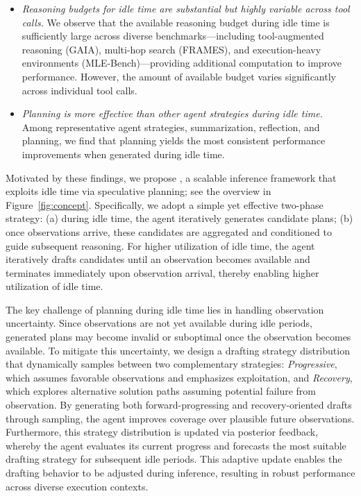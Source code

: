 \begin{itemize}
\item \textit{Reasoning budgets for idle time are substantial but highly variable across tool calls.} 
We observe that the available reasoning budget during idle time is sufficiently large across diverse benchmarks---including tool-augmented reasoning (GAIA), multi-hop search (FRAMES), and execution-heavy environments (MLE-Bench)---providing additional computation to improve performance. However, the amount of available budget varies significantly across individual tool calls.


\item \textit{Planning is more effective than other agent strategies during idle time.} 
Among representative agent strategies, \ie summarization, reflection, and planning, we find that planning yields the most consistent performance improvements when generated during idle time.
\end{itemize}

Motivated by these findings, we propose \lname, a scalable inference framework that exploits idle time via speculative planning; see the overview in Figure~\ref{fig:concept}. Specifically, we adopt a simple yet effective two-phase strategy: (a) during idle time, the agent iteratively generates candidate plans; (b) once observations arrive, these candidates are aggregated and conditioned to guide subsequent reasoning. For higher utilization of idle time, the agent iteratively drafts candidates until an observation becomes available and terminates immediately upon observation arrival, thereby enabling higher utilization of idle time. 


The key challenge of planning during idle time lies in handling observation uncertainty.
Since observations are not yet available during idle periods, generated plans may become invalid or suboptimal once the observation becomes available.
To mitigate this uncertainty, we design a drafting strategy distribution that dynamically samples between two complementary strategies: \textit{Progressive}, which assumes favorable observations and emphasizes exploitation, and \textit{Recovery}, which explores alternative solution paths assuming potential failure from observation. 
By generating both forward-progressing and recovery-oriented drafts through sampling, the agent improves coverage over plausible future observations.
Furthermore, this strategy distribution is updated via posterior feedback, whereby the agent evaluates its current progress and forecasts the most suitable drafting strategy for subsequent idle periods. This adaptive update enables the drafting behavior to be adjusted during inference, resulting in robust performance across diverse execution contexts.

